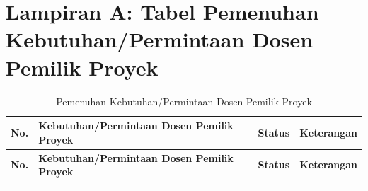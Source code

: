 
\section*{Lampiran A: Tabel Pemenuhan Kebutuhan/Permintaan Dosen Pemilik Proyek}
\label{lamp:tabel-pemenuhan}
\setcounter{table}{0}
\renewcommand{\thetable}{A.\arabic{table}}

{\footnotesize
\renewcommand{\arraystretch}{1.3}
\begin{longtable}{|p{0.6cm}|p{4.0cm}|p{1.8cm}|p{5.8cm}|}
  \caption{Pemenuhan Kebutuhan/Permintaan Dosen Pemilik Proyek} \\
  \hline
  \textbf{No.} & \textbf{Kebutuhan/Permintaan Dosen Pemilik Proyek} & \textbf{Status} & \textbf{Keterangan} \\
  \hline
  \endfirsthead
  \hline
  \textbf{No.} & \textbf{Kebutuhan/Permintaan Dosen Pemilik Proyek} & \textbf{Status} & \textbf{Keterangan} \\
  \hline
  \endhead
  \hline
  \endfoot

  \multicolumn{4}{|l|}{\textbf{TERCAPAI}} \\
  \hline


\end{longtable}}
